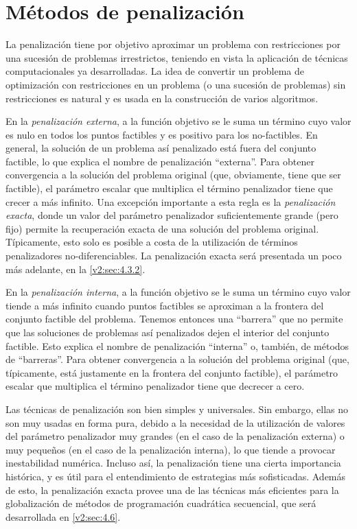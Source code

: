 
\section{Métodos de penalización}\label{v2:sec:4.3}

La penalización tiene por objetivo aproximar un problema con restricciones por una sucesión de problemas irrestrictos, teniendo en vista la aplicación de técnicas computacionales ya desarrolladas. La idea de convertir un problema de optimización con restricciones en un problema (o una sucesión de problemas) sin restricciones es natural y es usada en la construcción de varios algoritmos.

En la \textit{penalización externa}, a la función objetivo se le suma un término cuyo valor es nulo en todos los puntos factibles y es positivo para los no-factibles. En general, la solución de un problema así penalizado está fuera del conjunto factible, lo que explica el nombre de penalización ``externa''. Para obtener convergencia a la solución del problema original (que, obviamente, tiene que ser factible), el parámetro escalar que multiplica el término penalizador tiene que crecer a más infinito. Una excepción importante a esta regla es la \textit{penalización exacta}, donde un valor del parámetro penalizador suficientemente grande (pero fijo) permite la recuperación exacta de una solución del problema original. Típicamente, esto solo es posible a costa de la utilización de términos penalizadores no-diferenciables. La penalización exacta será presentada un poco más adelante, en la \cref{v2:sec:4.3.2}.

En la \textit{penalización interna}, a la función objetivo se le suma un término cuyo valor tiende a más infinito cuando puntos factibles se aproximan a la frontera del conjunto factible del problema. Tenemos entonces una ``barrera'' que no permite que las soluciones de problemas así penalizados dejen el interior del conjunto factible. Esto explica el nombre de penalización ``interna'' o, también, de métodos de ``barreras''. Para obtener convergencia a la solución del problema original (que, típicamente, está justamente en la frontera del conjunto factible), el parámetro escalar que multiplica el término penalizador tiene que decrecer a cero.

Las técnicas de penalización son bien simples y universales. Sin embargo, ellas no son muy usadas en forma pura, debido a la necesidad de la utilización de valores del parámetro penalizador muy grandes (en el caso de la penalización externa) o muy pequeños (en el caso de la penalización interna), lo que tiende a provocar inestabilidad numérica. Incluso así, la penalización tiene una cierta importancia histórica, y es útil para el entendimiento de estrategias más sofisticadas. Además de esto, la penalización exacta provee una de las técnicas más eficientes para la globalización de métodos de programación cuadrática secuencial, que será desarrollada en \cref{v2:sec:4.6}.


